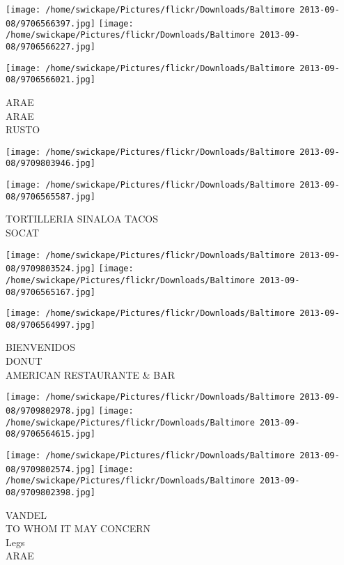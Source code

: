 \documentclass[10pt,letterpaper]{article}
\begin{document}
\texttt{[image: /home/swickape/Pictures/flickr/Downloads/Baltimore 2013-09-08/9706566397.jpg]}
\texttt{[image: /home/swickape/Pictures/flickr/Downloads/Baltimore 2013-09-08/9706566227.jpg]}

\texttt{[image: /home/swickape/Pictures/flickr/Downloads/Baltimore 2013-09-08/9706566021.jpg]}

ARAE\\
ARAE\\
RUSTO\\
\pagebreak

\texttt{[image: /home/swickape/Pictures/flickr/Downloads/Baltimore 2013-09-08/9709803946.jpg]}

\vspace{0.25in}
\texttt{[image: /home/swickape/Pictures/flickr/Downloads/Baltimore 2013-09-08/9706565587.jpg]}

TORTILLERIA SINALOA TACOS\\
SOCAT\\
\pagebreak

\texttt{[image: /home/swickape/Pictures/flickr/Downloads/Baltimore 2013-09-08/9709803524.jpg]}
\texttt{[image: /home/swickape/Pictures/flickr/Downloads/Baltimore 2013-09-08/9706565167.jpg]}

\vspace{0.25in}
\texttt{[image: /home/swickape/Pictures/flickr/Downloads/Baltimore 2013-09-08/9706564997.jpg]}

BIENVENIDOS\\
DONUT\\
AMERICAN RESTAURANTE \& BAR\\
\pagebreak

\texttt{[image: /home/swickape/Pictures/flickr/Downloads/Baltimore 2013-09-08/9709802978.jpg]}
\texttt{[image: /home/swickape/Pictures/flickr/Downloads/Baltimore 2013-09-08/9706564615.jpg]}

\texttt{[image: /home/swickape/Pictures/flickr/Downloads/Baltimore 2013-09-08/9709802574.jpg]}
\texttt{[image: /home/swickape/Pictures/flickr/Downloads/Baltimore 2013-09-08/9709802398.jpg]}

VANDEL\\
TO WHOM IT MAY CONCERN\\
Legs\\
ARAE\\
\pagebreak
\end{document}

